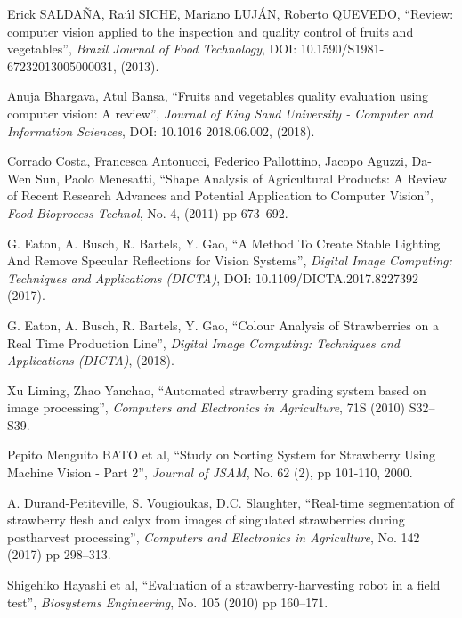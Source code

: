 \documentclass[conference]{IEEEtran}
\begin{document}

\begin{thebibliography}{1}
	
	Erick SALDAÑA, Raúl SICHE, Mariano LUJÁN, Roberto QUEVEDO, ``Review: computer vision applied to the inspection and quality control of fruits and vegetables'', {\em Brazil Journal of Food Technology}, DOI: 10.1590/S1981-67232013005000031, (2013).
	
	Anuja Bhargava, Atul Bansa, ``Fruits and vegetables quality evaluation using computer vision: A review'', {\em Journal of King Saud University - Computer and Information Sciences}, DOI: 10.1016 2018.06.002, (2018).
	
	Corrado Costa, Francesca Antonucci, Federico Pallottino, Jacopo Aguzzi, Da-Wen Sun, Paolo Menesatti, ``Shape Analysis of Agricultural Products: A Review of Recent Research Advances and Potential Application to Computer Vision'', {\em Food Bioprocess Technol}, No. 4, (2011) pp 673–692.
	
	G. Eaton, A. Busch, R. Bartels, Y. Gao, ``A Method To Create Stable Lighting And Remove Specular Reflections for Vision Systems'', {\em Digital Image Computing: Techniques and Applications (DICTA)}, DOI: 10.1109/DICTA.2017.8227392 (2017).
	
	G. Eaton, A. Busch, R. Bartels, Y. Gao, ``Colour Analysis of Strawberries on a Real Time Production Line'', {\em Digital Image Computing: Techniques and Applications (DICTA)}, (2018).
	
	Xu Liming, Zhao Yanchao, ``Automated strawberry grading system based on image processing'', {\em Computers and Electronics in Agriculture}, 71S (2010) S32–S39.
	
	Pepito Menguito BATO et al, ``Study on Sorting System for Strawberry Using Machine Vision - Part 2'', {\em Journal of JSAM}, No. 62 (2), pp 101-110, 2000.
	
	A. Durand-Petiteville, S. Vougioukas, D.C. Slaughter, ``Real-time segmentation of strawberry flesh and calyx from images of singulated strawberries during postharvest processing'', {\em Computers and Electronics in Agriculture}, No. 142 (2017) pp 298–313.
	
	Shigehiko Hayashi et al, ``Evaluation of a strawberry-harvesting robot in a field test'', {\em Biosystems Engineering}, No. 105 (2010) pp 160–171.
	

\end{thebibliography}
\end{document}
